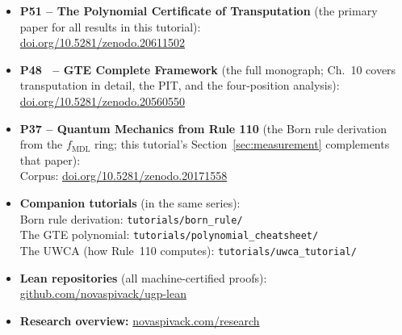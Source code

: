 \documentclass[11pt,a4paper]{article}
\begin{document}
\begin{tcolorbox}[colback=boxblue,colframe=blue!40!black,title=Where to Go Next]
\begin{itemize}[leftmargin=1.6em,itemsep=4pt]
  \item \textbf{P51 -- The Polynomial Certificate of Transputation} (the primary paper
    for all results in this tutorial):\\
    \href{https://doi.org/10.5281/zenodo.20611502}{doi.org/10.5281/zenodo.20611502}

  \item \textbf{P48~\cite{SpivackGTECompleteFramework} -- GTE Complete Framework} (the full monograph; Ch.~10 covers
    transputation in detail, the PIT, and the four-position analysis):\\
    \href{https://doi.org/10.5281/zenodo.20560550}{doi.org/10.5281/zenodo.20560550}

  \item \textbf{P37 -- Quantum Mechanics from Rule 110} (the Born rule derivation
    from the $f_{\mathrm{MDL}}$ ring; this tutorial's Section~\ref{sec:measurement}
    complements that paper):\\
    Corpus: \href{https://doi.org/10.5281/zenodo.20171558}{doi.org/10.5281/zenodo.20171558}

  \item \textbf{Companion tutorials} (in the same series):\\
    Born rule derivation: \texttt{tutorials/born\_rule/}\\
    The GTE polynomial: \texttt{tutorials/polynomial\_cheatsheet/}\\
    The UWCA (how Rule~110 computes): \texttt{tutorials/uwca\_tutorial/}

  \item \textbf{Lean repositories} (all machine-certified proofs):\\
    \href{https://github.com/novaspivack/ugp-lean}{github.com/novaspivack/ugp-lean}

  \item \textbf{Research overview:}
    \href{https://novaspivack.com/research}{novaspivack.com/research}
\end{itemize}
\end{tcolorbox}
\end{document}
